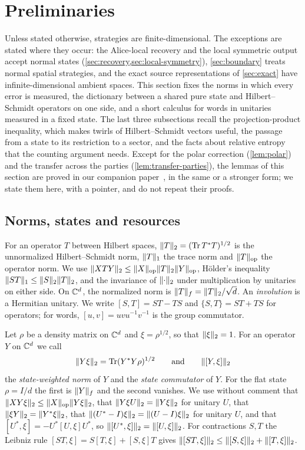 \section{Preliminaries}\label{sec:prelim}

Unless stated otherwise, strategies are finite-dimensional. The exceptions are stated where they occur: the Alice-local
recovery and the local symmetric output accept normal states (\cref{sec:recovery,sec:local-symmetry}), \cref{sec:boundary} treats
normal spatial strategies, and the exact source representations of \cref{sec:exact} have infinite-dimensional ambient spaces.
This section fixes the norms in which every
error is measured, the
dictionary between a shared pure state and Hilbert--Schmidt operators on one side, and a short calculus for words in
unitaries measured in a fixed state. The last three subsections recall the projection-product inequality, which makes
twirls of Hilbert--Schmidt vectors useful, the passage from a state to its restriction to a sector, and the facts about
relative entropy that the counting argument needs. Except for the polar correction (\cref{lem:polar}) and the transfer
across the parties (\cref{lem:transfer-parties}), the lemmas of this section are proved in our companion
paper~\cite[Section~3]{DM-game}, in the same or a stronger form; we state them here, with a pointer, and do not repeat
their proofs.

\subsection{Norms, states and resources}\label{sec:prelim-norms}

For an operator $T$ between Hilbert spaces, $\lVert T\rVert_2=(\operatorname{Tr} T^*T)^{1/2}$ is the unnormalized Hilbert--Schmidt norm,
$\lVert T\rVert_1$ the trace norm and $\lVert T\rVert_{\mathrm{op}}$ the operator norm. We use $\lVert XTY\rVert_2\le\lVert X\rVert_{\mathrm{op}}\lVert T\rVert_2\lVert Y\rVert_{\mathrm{op}}$, Hölder's inequality
$\lVert ST\rVert_1\le\lVert S\rVert_2\lVert T\rVert_2$, and the invariance of $\lVert \cdot\rVert_2$ under multiplication by unitaries on either side. On $\mathbb C^d$,
the normalized norm is $\lVert T\rVert_{f}=\lVert T\rVert_2/\sqrt d$. An \emph{involution} is a Hermitian unitary. We write $[S,T]=ST-TS$ and
$\{S,T\}=ST+TS$ for operators; for words, $[u,v]=uvu^{-1}v^{-1}$ is the group commutator.

Let $\rho$ be a density matrix on $\mathbb C^d$ and $\xi=\rho^{1/2}$, so that $\lVert \xi\rVert_2=1$. For an operator $Y$ on $\mathbb C^d$ we
call
\[
\lVert Y\xi\rVert_2=\operatorname{Tr}(Y^*Y\rho)^{1/2}\qquad\text{and}\qquad\lVert [Y,\xi]\rVert_2
\]
the \emph{state-weighted norm} of $Y$ and the \emph{state commutator} of $Y$. For the flat state $\rho=I/d$ the first is
$\lVert Y\rVert_{f}$ and the second vanishes. We use without comment that $\lVert XY\xi\rVert_2\le\lVert X\rVert_{\mathrm{op}}\lVert Y\xi\rVert_2$, that $\lVert Y\xi U\rVert_2=\lVert Y\xi\rVert_2$
for unitary $U$, that $\lVert \xi Y\rVert_2=\lVert Y^*\xi\rVert_2$, that $\lVert (U^*-I)\xi\rVert_2=\lVert (U-I)\xi\rVert_2$ for unitary $U$, and that
$[U^*,\xi]=-U^*[U,\xi]U^*$, so $\lVert [U^*,\xi]\rVert_2=\lVert [U,\xi]\rVert_2$. For contractions $S,T$ the Leibniz rule
$[ST,\xi]=S[T,\xi]+[S,\xi]T$ gives $\lVert [ST,\xi]\rVert_2\le\lVert [S,\xi]\rVert_2+\lVert [T,\xi]\rVert_2$.

